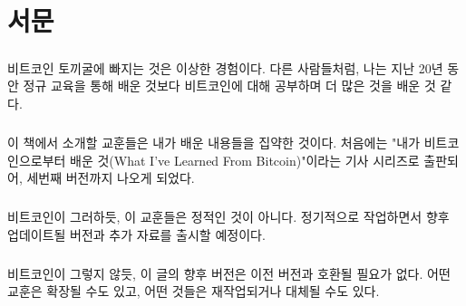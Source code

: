 \chapter*{서문}

\paragraph{}
비트코인 토끼굴에 빠지는 것은 이상한 경험이다. 
다른 사람들처럼, 나는 지난 20년 동안 정규 교육을 통해 배운 것보다 비트코인에 대해 공부하며 더 많은 것을 배운 것 같다.

\paragraph{}
이 책에서 소개할 교훈들은 내가 배운 내용들을 집약한 것이다. 처음에는 "내가 비트코인으로부터 배운 것(What I’ve Learned From Bitcoin)"이라는 기사 시리즈로 출판되어, 세번째 버전까지 나오게 되었다.

\paragraph{}
비트코인이 그러하듯, 이 교훈들은 정적인 것이 아니다.
정기적으로 작업하면서 향후 업데이트될 버전과 추가 자료를 출시할 예정이다.

\paragraph{}
비트코인이 그렇지 않듯, 이 글의 향후 버전은 이전 버전과 호환될 필요가 없다.
어떤 교훈은 확장될 수도 있고, 어떤 것들은 재작업되거나 대체될 수도 있다. 

